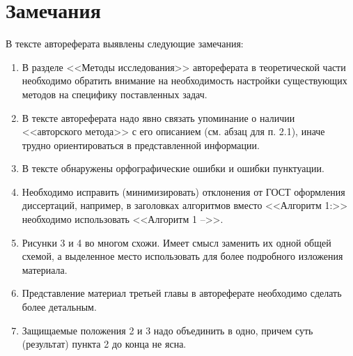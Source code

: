 \documentclass[12pt]{extarticle}
\begin{document}
\section{Замечания}
В тексте автореферата выявлены следующие замечания:
\begin{enumerate}
\item В разделе <<Методы исследования>> автореферата в теоретической части необходимо обратить внимание на необходимость настройки существующих методов на специфику поставленных задач.
\item В тексте автореферата надо явно связать упоминание о наличии <<авторского метода>> с его описанием (см. абзац для п. 2.1), иначе трудно ориентироваться в представленной информации.
\item В тексте обнаружены орфографические ошибки и ошибки пунктуации.
\item Необходимо исправить (минимизировать) отклонения от ГОСТ оформления диссертаций, например, в заголовках алгоритмов вместо <<Алгоритм 1:>> необходимо использовать <<Алгоритм 1 -->>. \label{p:gost}
\item Рисунки 3 и 4 во многом схожи.  Имеет смысл заменить их одной общей схемой, а выделенное место использовать для более подробного изложения материала.
\item Представление материал третьей главы в автореферате необходимо сделать более детальным.
\item Защищаемые положения 2 и 3 надо объединить в одно, причем суть (результат) пункта 2 до конца не ясна.
\end{enumerate}
\end{document}

